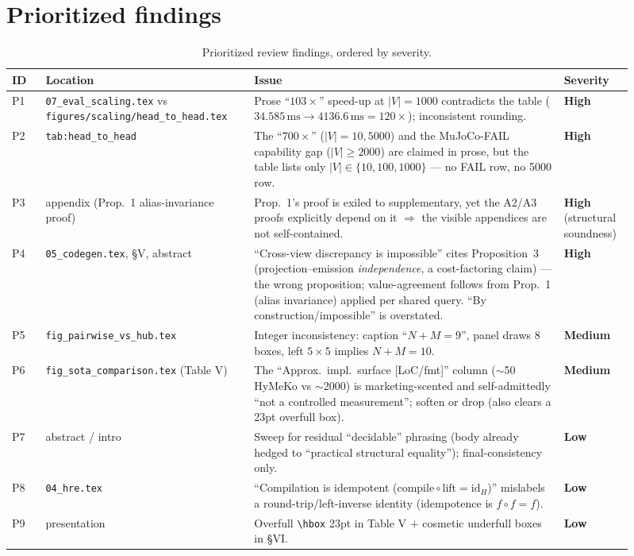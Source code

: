\documentclass[11pt]{article}
\newcommand{\sev}[1]{\textbf{#1}}
\newcommand{\file}[1]{\texttt{#1}}
\begin{document}
\section{Prioritized findings}

\begin{table}[h]
\centering
\small
\begin{tabular}{@{}p{0.05\linewidth} p{0.30\linewidth} p{0.46\linewidth} p{0.10\linewidth}@{}}
\toprule
\textbf{ID} & \textbf{Location} & \textbf{Issue} & \textbf{Severity} \\
\midrule
P1 & \file{07\_eval\_scaling.tex} vs \file{figures/scaling/head\_to\_head.tex} & Prose ``$103\times$'' speed-up at $|V|{=}1000$ contradicts the table ($34.585\,\text{ms}\rightarrow 4136.6\,\text{ms} = 120\times$); inconsistent rounding. & \sev{High} \\
\addlinespace
P2 & \file{tab:head\_to\_head} & The ``$700\times$'' ($|V|{=}10{,}5000$) and the MuJoCo-FAIL capability gap ($|V|{\geq}2000$) are claimed in prose, but the table lists only $|V|\in\{10,100,1000\}$ --- no FAIL row, no 5000 row. & \sev{High} \\
\addlinespace
P3 & appendix (Prop.\ 1 alias-invariance proof) & Prop.\ 1's proof is exiled to supplementary, yet the A2/A3 proofs explicitly depend on it $\Rightarrow$ the visible appendices are not self-contained. & \sev{High} (structural soundness) \\
\addlinespace
P4 & \file{05\_codegen.tex}, \S V, abstract & ``Cross-view discrepancy is impossible'' cites Proposition~3 (projection--emission \emph{independence}, a cost-factoring claim) --- the wrong proposition; value-agreement follows from Prop.~1 (alias invariance) applied per shared query. ``By construction/impossible'' is overstated. & \sev{High} \\
\addlinespace
P5 & \file{fig\_pairwise\_vs\_hub.tex} & Integer inconsistency: caption ``$N{+}M{=}9$'', panel draws 8 boxes, left $5{\times}5$ implies $N{+}M{=}10$. & \sev{Medium} \\
\addlinespace
P6 & \file{fig\_sota\_comparison.tex} (Table V) & The ``Approx.\ impl.\ surface [LoC/fmt]'' column ($\sim$50 HyMeKo vs $\sim$2000) is marketing-scented and self-admittedly ``not a controlled measurement''; soften or drop (also clears a 23pt overfull box). & \sev{Medium} \\
\addlinespace
P7 & abstract / intro & Sweep for residual ``decidable'' phrasing (body already hedged to ``practical structural equality''); final-consistency only. & \sev{Low} \\
\addlinespace
P8 & \file{04\_hre.tex} & ``Compilation is idempotent ($\text{compile}\circ\text{lift}=\mathrm{id}_H$)'' mislabels a round-trip/left-inverse identity (idempotence is $f\circ f=f$). & \sev{Low} \\
\addlinespace
P9 & presentation & Overfull \texttt{\textbackslash hbox} 23pt in Table V $+$ cosmetic underfull boxes in \S VI. & \sev{Low} \\
\bottomrule
\end{tabular}
\caption{Prioritized review findings, ordered by severity.}
\label{tab:findings}
\end{table}
\end{document}
